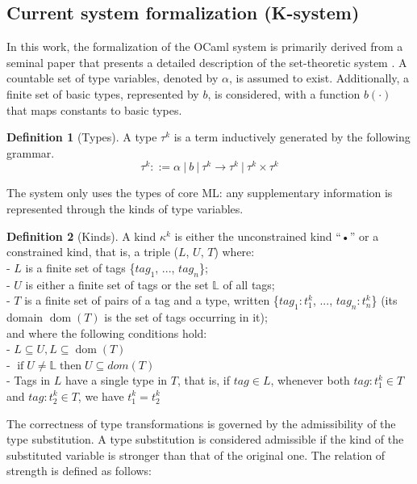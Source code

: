 \documentclass[a4paper,11pt,oneside]{article}
\theoremstyle{definition}
\newtheorem{defsec}{Definition}[section]
\begin{document}
\subsection{Current system formalization (K-system)}

In this work, the formalization of the OCaml system is primarily derived from a seminal paper that presents a detailed description of the set-theoretic system \cite{Castagna_2016}. A countable set of type variables, denoted by $\alpha$, is assumed to exist. Additionally, a finite set of basic types, represented by $b$, is considered, with a function $b(\cdot)$ that maps constants to basic types.

\begin{defsec}[Types]
  A type $\tau^k$ is a term inductively generated by the following grammar.
  $$ \tau^k ::= \alpha\ |\ b\ |\ \tau^k \rightarrow \tau^k\ |\ \tau^k \times \tau^k $$
\end{defsec}

The system only uses the types of core ML: any supplementary information
is represented through the kinds of type variables.

\begin{defsec}[Kinds]
  A kind $\kappa^k$ is either the unconstrained kind “•” or a constrained
  kind, that is, a triple ($L$, $U$, $T$) where:\\
  - $L$ is a finite set of tags \{$tag_1$, ..., $tag_n$\};\\
  - $U$ is either a finite set of tags or the set $\mathbb{L}$ of all tags;\\
  - $T$ is a finite set of pairs of a tag and a type, written \{$tag_1 : t^k_1$,
  ..., $tag_n : t^k_n$\} (its domain $\operatorname{dom}(T)$ is the set of tags occurring
  in it);\\
  and where the following conditions hold:\\
  - $L \subseteq U , L \subseteq \operatorname{dom}(T)$\\
  - $\operatorname{if} U \not= \mathbb{L} \operatorname{then} U \subseteq dom(T)$\\
  - Tags in $L$ have a single type in $T$, that is, if $tag \in L$, whenever
  both $tag : t^k_1 \in T$ and $tag : t^k_2 \in T$, we have $t^k_1 = t^k_2$\\
\end{defsec}

The correctness of type transformations is governed by the admissibility of the type substitution. A type substitution is considered admissible if the kind of the substituted variable is stronger than that of the original one. The relation of strength is defined as follows:
\end{document}
